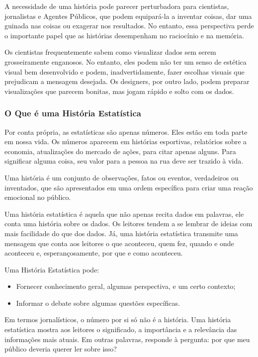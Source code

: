 A necessidade de uma história pode parecer perturbadora para cientistas, jornalistas e Agentes Públicos, que podem equipará-la a inventar coisas, dar uma guinada nas coisas ou exagerar nos resultados. No entanto, essa perspectiva perde o importante papel que as histórias desempenham no raciocínio e na memória.\vskip0.3cm

Os cientistas frequentemente sabem como visualizar dados sem serem grosseiramente enganosos. No entanto, eles podem não ter um senso de estética visual bem desenvolvido e podem, inadvertidamente, fazer escolhas visuais que prejudicam a mensagem desejada. Os designers, por outro lado, podem preparar visualizações que parecem bonitas, mas jogam rápido e solto com os dados. 

\subsubsection{O Que é uma História Estatística}

Por conta própria, as estatísticas são apenas números. Eles estão em toda parte em nossa vida. Os números aparecem em histórias esportivas, relatórios sobre a economia, atualizações do mercado de ações, para citar apenas alguns. Para significar alguma coisa, seu valor para a pessoa na rua deve ser trazido à vida.\vskip0.3cm 

Uma história é um conjunto de observações, fatos ou eventos, verdadeiros ou inventados, que são apresentados em uma ordem específica para criar uma reação emocional no público.\vskip0.3cm 

Uma história estatística é aquela que não apenas recita dados em palavras, ele conta uma história sobre os dados. Os leitores tendem a se lembrar de ideias com mais facilidade do que dos dados. Já, uma história estatística transmite uma mensagem que conta aos leitores o que aconteceu, quem fez, quando e onde aconteceu e, esperançosamente, por que e como aconteceu.\vskip0.3cm 


Uma História Estatística pode:

\begin{itemize}
    \item Fornecer conhecimento geral, algumas perspectiva, e um certo contexto;
    \item Informar o debate sobre algumas questões específicas.
\end{itemize}


Em termos jornalísticos, o número por si só não é a história. Uma história estatística mostra aos leitores o significado, a importância e a relevância das informações mais atuais. Em outras palavras, responde à pergunta: por que meu público deveria querer ler sobre isso?\vskip0.3cm 

